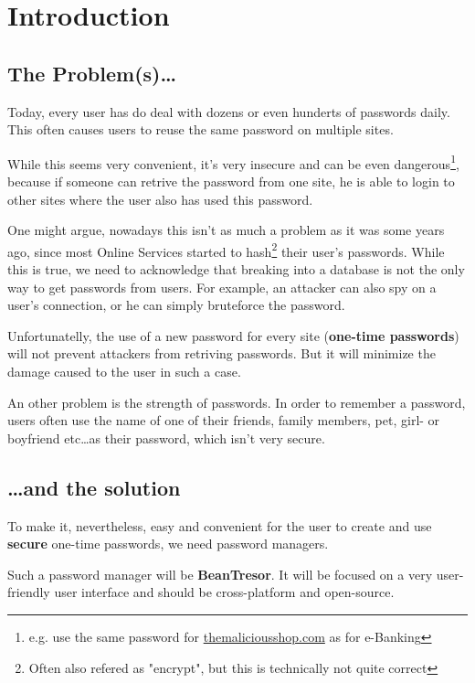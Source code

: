 \documentclass[11pt,a4paper,titlepage,portrait,english,final]{scrartcl}
\title{\docTitle}
\subtitle{\docSubtitle}
\author{\large\scshape \docAuthor \\ \large\scshape\textbf{\href{http://kije.ch}{kije-dev}}}
\date{\normalsize\scshape\docDate}
\begin{document}
\maketitle
\newpage
\tableofcontents
\newpage

\section{Introduction}
\subsection*{The Problem(s)\ldots}
Today, every user has do deal with dozens or even hunderts of passwords daily.
This often causes users to reuse the same password on multiple sites. 

While this seems very convenient, it's very insecure and can be even dangerous\footnote{e.g. use the same password for \url{themaliciousshop.com} as for e-Banking}, because if someone can retrive the password from one site, he is able to login to other sites where the user also has used this password. 

One might argue, nowadays this isn't as much a problem as it was some years ago, since most Online Services started to hash\footnote{Often also refered as "encrypt", but this is technically not quite correct} their user's passwords. While this is true, we need to acknowledge that breaking into a database is not the only way to get passwords from users. For example, an attacker can also spy on a user's connection, or he can simply bruteforce the password.

Unfortunatelly, the use of a new password for every site (\textbf{one-time passwords}) will not prevent attackers from retriving passwords. But it will minimize the damage caused to the user in such a case.

An other problem is the strength of passwords. In order to remember a password, users often use the name of one of their friends, family members, pet, girl- or boyfriend etc\ldots as their password, which isn't very secure.

\subsection*{\ldots and the solution}
To make it, nevertheless, easy and convenient for the user to create and use \textbf{secure} one-time passwords, we need password managers.

Such a password manager will be \textbf{BeanTresor}. It will be focused on a very user-friendly user interface and should be cross-platform and open-source.
\end{document}
